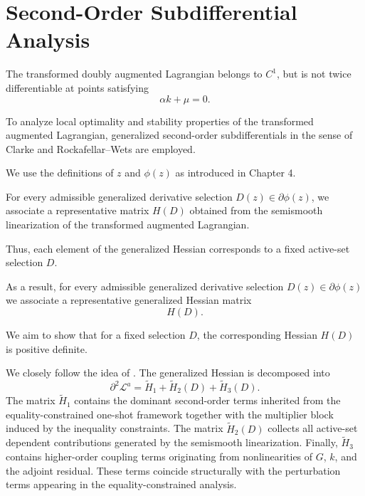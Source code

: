 \documentclass[11pt]{article}
\newcommand{\DLag}{\mathcal L^a}
\begin{document}
\section{Second-Order Subdifferential Analysis}

The transformed doubly augmented Lagrangian belongs to $C^1$, but is
not twice differentiable at points satisfying
\[
\alpha k+\mu=0.
\]

To analyze local optimality and stability properties of the transformed augmented Lagrangian, generalized second-order subdifferentials in the sense of Clarke \cite{clarke1983} and Rockafellar--Wets \cite{rockafellar2009} are employed.

We use the definitions of $z$ and $\phi(z)$ as introduced in Chapter 4. 


For every admissible generalized derivative selection
$D(z)\in\partial\phi(z)$, we associate a representative matrix
$H(D)$ obtained from the semismooth linearization of the transformed augmented Lagrangian.

Thus, each element of the generalized Hessian corresponds to a fixed active-set selection $D$. %

As a result, for every admissible generalized derivative selection
$D(z)\in\partial\phi(z)$ we associate a representative
generalized Hessian matrix
\[
H(D).
\]

We aim to show that for a fixed selection $D$, the corresponding Hessian $H(D)$ is positive definite. 

We closely follow the idea of \cite{walther2018equality}. The generalized Hessian is decomposed into
\[
\partial^2\DLag
=
\tilde H_1+\tilde H_2(D)+\tilde H_3(D).
\]
The matrix $\tilde H_1$ contains the dominant second-order terms inherited from the equality-constrained one-shot framework together with the multiplier block induced by the inequality constraints. The matrix $\tilde H_2(D)$ collects all active-set dependent contributions generated by the semismooth linearization. Finally, $\tilde H_3$ contains higher-order coupling terms originating from nonlinearities of $G$, $k$, and the adjoint residual. These terms coincide structurally with the perturbation terms appearing in the equality-constrained analysis.
\end{document}
